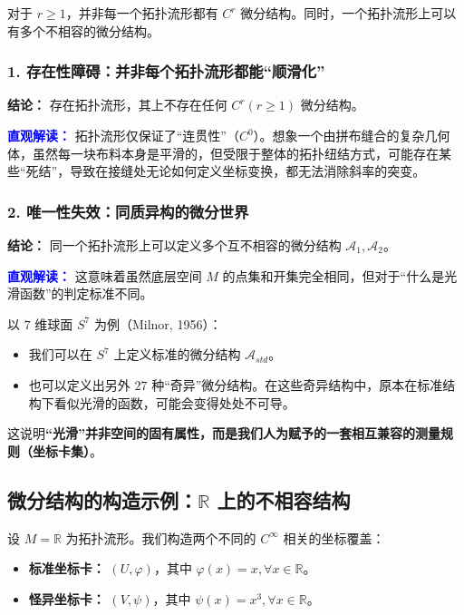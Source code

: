 \begin{myremark}
 对于 $r \ge 1$，并非每一个拓扑流形都有 $C^r$ 微分结构。同时，一个拓扑流形上可以有多个不相容的微分结构。


\subsubsection*{1. 存在性障碍：并非每个拓扑流形都能“顺滑化”}

\textbf{结论：} 存在拓扑流形，其上不存在任何 $C^r (r \ge 1)$ 微分结构。

\textbf{\textcolor{blue}{直观解读：}}
拓扑流形仅保证了“连贯性”（$C^0$）。想象一个由拼布缝合的复杂几何体，虽然每一块布料本身是平滑的，但受限于整体的拓扑纽结方式，可能存在某些“死结”，导致在接缝处无论如何定义坐标变换，都无法消除斜率的突变。

\subsubsection*{2. 唯一性失效：同质异构的微分世界}

\textbf{结论：} 同一个拓扑流形上可以定义多个互不相容的微分结构 $\mathcal{A}_1, \mathcal{A}_2$。

\textbf{\textcolor{blue}{直观解读：}}
这意味着虽然底层空间 $M$ 的点集和开集完全相同，但对于“什么是光滑函数”的判定标准不同。

以 $7$ 维球面 $S^7$ 为例（Milnor, 1956）：
\begin{itemize}
    \item 我们可以在 $S^7$ 上定义标准的微分结构 $\mathcal{A}_{std}$。
    \item 也可以定义出另外 $27$ 种“奇异”微分结构。在这些奇异结构中，原本在标准结构下看似光滑的函数，可能会变得处处不可导。
\end{itemize}
这说明{\bf “光滑”并非空间的固有属性，而是我们人为赋予的一套相互兼容的测量规则（坐标卡集）}。

\subsection*{微分结构的构造示例：$\mathbb{R}$ 上的不相容结构}

设 $M = \mathbb{R}$ 为拓扑流形。我们构造两个不同的 $C^\infty$ 相关的坐标覆盖：
\begin{itemize}
    \item \textbf{标准坐标卡：} $(U, \varphi)$，其中 $\varphi(x) = x, \forall x \in \mathbb{R}$。
    \item \textbf{怪异坐标卡：} $(V, \psi)$，其中 $\psi(x) = x^3, \forall x \in \mathbb{R}$。
\end{itemize}


\end{myremark}
